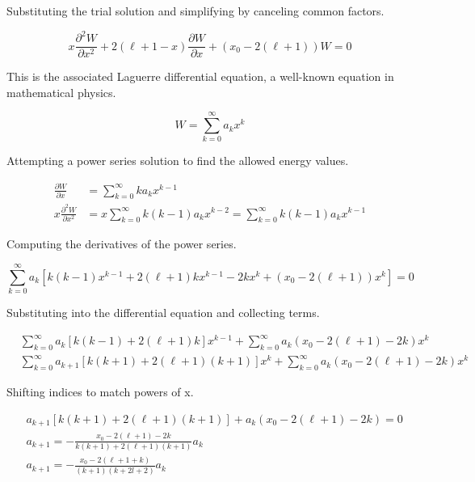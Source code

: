 Substituting the trial solution and simplifying by canceling common factors.

\begin{equation}
x \frac{\partial^{2} W}{\partial x^{2}}+2(\ell+1-x) \frac{\partial W}{\partial x}+\left(x_{0}-2(\ell+1)\right) W=0
\end{equation}

This is the associated Laguerre differential equation, a well-known equation in mathematical physics.

\begin{equation}
W=\sum_{k=0}^{\infty} a_{k} x^{k}
\end{equation}

Attempting a power series solution to find the allowed energy values.

\begin{align}
\frac{\partial W}{\partial x} & =\sum_{k=0}^{\infty} k a_{k} x^{k-1} \\
x \frac{\partial^{2} W}{\partial x^{2}} & =x \sum_{k=0}^{\infty} k(k-1) a_{k} x^{k-2}=\sum_{k=0}^{\infty} k(k-1) a_{k} x^{k-1}
\end{align}

Computing the derivatives of the power series.

\begin{equation}
\sum_{k=0}^{\infty} a_{k}\left[k(k-1) x^{k-1}+2(\ell+1) k x^{k-1}-2 k x^{k}+\left(x_{0}-2(\ell+1)\right) x^{k}\right]=0
\end{equation}

Substituting into the differential equation and collecting terms.

\begin{align}
& \sum_{k=0}^{\infty} a_{k}[k(k-1)+2(\ell+1) k] x^{k-1}+\sum_{k=0}^{\infty} a_{k}\left(x_{0}-2(\ell+1)-2 k\right) x^{k} \\
& \sum_{k=0}^{\infty} a_{k+1}[k(k+1)+2(\ell+1)(k+1)] x^{k}+\sum_{k=0}^{\infty} a_{k}\left(x_{0}-2(\ell+1)-2 k\right) x^{k}
\end{align}

Shifting indices to match powers of x.

\begin{align}
& a_{k+1}[k(k+1)+2(\ell+1)(k+1)]+a_{k}\left(x_{0}-2(\ell+1)-2 k\right)=0 \\
& a_{k+1}=-\frac{x_{0}-2(\ell+1)-2 k}{k(k+1)+2(\ell+1)(k+1)} a_{k}  \\
& a_{k+1}=-\frac{x_{0}-2(\ell+1+k)}{(k+1)(k+2 l+2)} a_{k}
\end{align}

